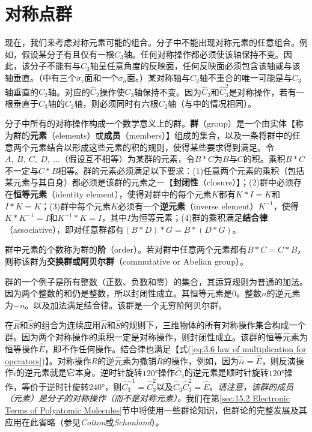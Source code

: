 \section{对称点群}
\label{sec:12.2 Symmetry Point Groups}

    现在，我们来考虑对称元素可能的组合。分子中不能出现对称元素的任意组合。例如，假设某分子有且仅有一根$C_3$轴。任何对称操作都必须使该轴保持不变。因此，该分子不能有与$C_3$轴呈任意角度的反映面，任何反映面必须包含该轴或与该轴垂直。（中有三个$\sigma_v$面和一个$\sigma_h$面。）某对称轴与$C_3$轴不重合的唯一可能是与$C_3$轴垂直的$C_2$轴。对应的$\hat{C}_2$操作使$C_3$轴保持不变。因为$\hat{C}_3$和$\hat{C}_3^2$是对称操作，若有一根垂直于$C_3$轴的$C_2$轴，则必须同时有六根$C_2$轴（与中的情况相同）。

    分子中所有的对称操作构成一个数学意义上的群。\textbf{群}（group）是一个由实体【称为群的\textbf{元素}（elements）或\textbf{成员}（members）】组成的集合，以及一条将群中的任意两个元素结合以形成这些元素的积的规则，使得某些要求得到满足。令$A,\:B,\:C,\:D,\:\ldots$（假设互不相等）为某群的元素，令$B \ast C$为$B$与$C$的积。乘积$B \ast C$不一定与$C \ast B$相等。群的元素必须满足以下要求：(1)任意两个元素的乘积（包括某元素与其自身）都必须是该群的元素之一【\textbf{封闭性}（closure）】；(2)群中必须存在\textbf{恒等元素}（identity element），使得对群中的每个元素$K$都有$K \ast I = K$和$I \ast K = K$；(3)群中每个元素$K$必须有一个\textbf{逆元素}（inverse element）$K^{-1}$，使得$K \ast K^{-1} = I$和$K^{-1} \ast K = I$，其中$I$为恒等元素；(4)群的乘积满足\textbf{结合律}（associative），即对任意群都有$\left(B \ast D\right) \ast G = B \ast \left(D \ast G\right)$。

    群中元素的个数称为群的\textbf{阶}（order）。若对群中任意两个元素都有$B \ast C = C \ast B$，则称该群为\textbf{交换群或阿贝尔群}（commutative or Abelian group）。

    群的一个例子是所有整数（正数、负数和零）的集合，其运算规则为普通的加法。因为两个整数的和仍是整数，所以封闭性成立。其恒等元素是$0$。整数$n$的逆元素为$-n$。以及加法满足结合律。该群是一个无穷阶阿贝尔群。

    在$\hat{R}$和$\hat{S}$的组合为连续应用$\hat{R}$和$\hat{S}$的规则下，三维物体的所有对称操作集合构成一个群。因为两个对称操作的乘积一定是对称操作，则封闭性成立。该群的恒等元素为恒等操作$\hat{E}$，即不作任何操作。结合律也满足【式(\ref{eq:3.6 law of multiplication for operators})】。对称操作$\hat{R}$的逆元素为撤销$\hat{R}$的操作，例如，因为$\hat{i}\hat{i} = \hat{E}$，则反演操作$\hat{i}$的逆元素就是它本身。逆时针旋转$120°$操作$\hat{C}_3$的逆元素是顺时针旋转$120°$操作，等价于逆时针旋转$240°$，则$\hat{C}_3^{-1} = \hat{C}_3^2$以及$\hat{C}_3\hat{C}_3^2 = \hat{E}$。\textit{请注意，该群的成员（元素）是分子的对称操作（而不是对称元素）。}我们在第\ref{sec:15.2 Electronic Terms of Polyatomic Molecules}节中将使用一些群论知识，但群论的完整发展及其应用在此省略（参见\textit{Cotton}或\textit{Schonland}）。

